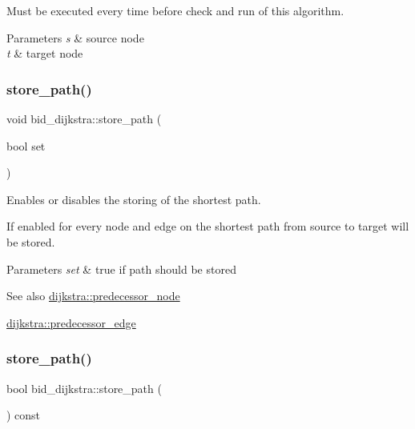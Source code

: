 Must be executed every time before check and run of this algorithm.


\begin{DoxyParams}{Parameters}
{\em s} & source node \\
\hline
{\em t} & target node \\
\hline
\end{DoxyParams}
\mbox{\label{classbid__dijkstra_a0032d9b44c8b3f6f5733ff3ef94cf169}} 
\subsubsection{\texorpdfstring{store\+\_\+path()}{store\_path()}\hspace{0.1cm}{\footnotesize\ttfamily [1/2]}}
{\footnotesize\ttfamily void bid\+\_\+dijkstra\+::store\+\_\+path (\begin{DoxyParamCaption}\item[{bool}]{set }\end{DoxyParamCaption})}



Enables or disables the storing of the shortest path. 

If enabled for every node and edge on the shortest path from source to target will be stored.


\begin{DoxyParams}{Parameters}
{\em set} & true if path should be stored\\
\hline
\end{DoxyParams}
\begin{DoxySeeAlso}{See also}
\mbox{\hyperlink{classdijkstra_a99c17ee7c2b55574ea8c2952fac09faf}{dijkstra\+::predecessor\+\_\+node}} 

\mbox{\hyperlink{classdijkstra_aa3ef1a7d7dfc33e4a39aff309f873929}{dijkstra\+::predecessor\+\_\+edge}} 
\end{DoxySeeAlso}
\mbox{\label{classbid__dijkstra_ad9716d8f542f07e5696aba778417cc12}} 
\subsubsection{\texorpdfstring{store\+\_\+path()}{store\_path()}\hspace{0.1cm}{\footnotesize\ttfamily [2/2]}}
{\footnotesize\ttfamily bool bid\+\_\+dijkstra\+::store\+\_\+path (\begin{DoxyParamCaption}{ }\end{DoxyParamCaption}) const}



